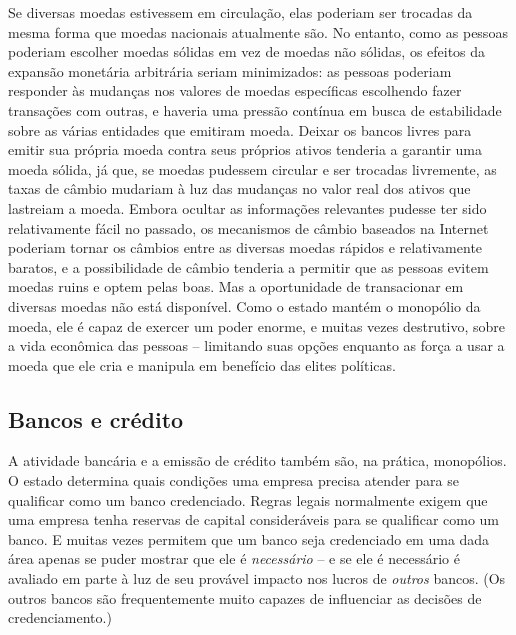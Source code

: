 Se diversas moedas estivessem em circulação, elas poderiam ser trocadas da mesma forma que moedas nacionais atualmente são. No entanto, como as pessoas poderiam escolher moedas sólidas em vez de moedas não sólidas, os efeitos da expansão monetária arbitrária seriam minimizados: as pessoas poderiam responder às mudanças nos valores de moedas específicas escolhendo fazer transações com outras, e haveria uma pressão contínua em busca de estabilidade sobre as várias entidades que emitiram moeda. Deixar os bancos livres para emitir sua própria moeda contra seus próprios ativos tenderia a garantir uma moeda sólida, já que, se moedas pudessem circular e ser trocadas livremente, as taxas de câmbio mudariam à luz das mudanças no valor real dos ativos que lastreiam a moeda. Embora ocultar as informações relevantes pudesse ter sido relativamente fácil no passado, os mecanismos de câmbio baseados na Internet poderiam tornar os câmbios entre as diversas moedas rápidos e relativamente baratos, e a possibilidade de câmbio tenderia a permitir que as pessoas evitem moedas ruins e optem pelas boas. Mas a oportunidade de transacionar em diversas moedas não está disponível. Como o estado mantém o monopólio da moeda, ele é capaz de exercer um poder enorme, e muitas vezes destrutivo, sobre a vida econômica das pessoas -- limitando suas opções enquanto as força a usar a moeda que ele cria e manipula em benefício das elites políticas.

\subsection*{Bancos e crédito}

A atividade bancária e a emissão de crédito também são, na prática, monopólios. O estado determina quais condições uma empresa precisa atender para se qualificar como um banco credenciado. Regras legais normalmente exigem que uma empresa tenha reservas de capital consideráveis para se qualificar como um banco. E muitas vezes permitem que um banco seja credenciado em uma dada área apenas se puder mostrar que ele é \emph{necessário} -- e se ele é necessário é avaliado em parte à luz de seu provável impacto nos lucros de \emph{outros} bancos. (Os outros bancos são frequentemente muito capazes de influenciar as decisões de credenciamento.)

